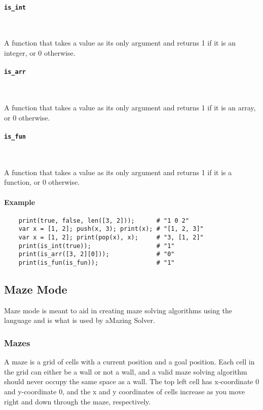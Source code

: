 \paragraph{\texttt{is\_int}} \

A function that takes a value as its only argument and returns 1 if it is an integer, or 0 otherwise.

\paragraph{\texttt{is\_arr}} \

A function that takes a value as its only argument and returns 1 if it is an array, or 0 otherwise.

\paragraph{\texttt{is\_fun}} \

A function that takes a value as its only argument and returns 1 if it is a function, or 0 otherwise.

\paragraph{Example}

\begin{verbatim}
    print(true, false, len([3, 2]));      # "1 0 2"
    var x = [1, 2]; push(x, 3); print(x); # "[1, 2, 3]"
    var x = [1, 2]; print(pop(x), x);     # "3, [1, 2]"
    print(is_int(true));                  # "1"
    print(is_arr([3, 2][0]));             # "0"
    print(is_fun(is_fun));                # "1"
\end{verbatim}

\subsection{Maze Mode}

Maze mode is meant to aid in creating maze solving algorithms using the language and is what is used by aMazing Solver.

\subsubsection{Mazes}

A maze is a grid of cells with a current position and a goal position. Each cell in the grid can either be a wall or not a wall, and a valid maze solving algorithm should never occupy the same space as a wall. The top left cell has x-coordinate 0 and y-coordinate 0, and the x and y coordinates of cells increase as you move right and down through the maze, respectively.

